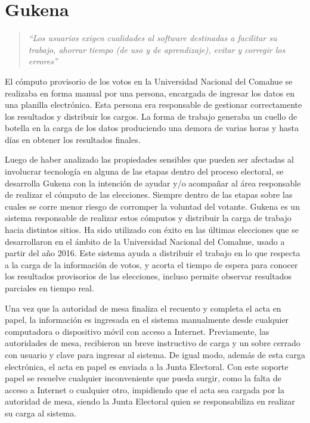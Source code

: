 \label{Gukena}
\chapter{Gukena}
\begin{quote}\textit{``Los usuarios exigen cualidades al software destinadas a facilitar su trabajo, ahorrar tiempo (de uso y de aprendizaje), evitar y corregir los errores''} \cite{definicionUsuarioInterfaz}\end{quote} 
El cómputo provisorio de los votos en la Universidad Nacional del Comahue se realizaba en forma manual por una persona, encargada de ingresar los datos en una planilla electrónica. Esta persona era responsable de gestionar correctamente los resultados y distribuir los cargos. La forma de trabajo generaba un cuello de botella en la carga de los datos produciendo una demora de varias horas y hasta días en obtener los resultados finales.

Luego de haber analizado las propiedades sensibles que pueden ser afectadas al involucrar tecnología en alguna de las etapas dentro del proceso electoral, se desarrolla Gukena con la intención de ayudar y/o 
acompañar al área responsable de realizar el cómputo de las elecciones. Siempre dentro de las etapas sobre las cuales se corre menor riesgo de corromper la voluntad del votante. Gukena es un sistema responsable de realizar estos cómputos y distribuir la carga de trabajo hacia distintos sitios. Ha sido utilizado con éxito en las últimas elecciones que se desarrollaron en el ámbito de la Universidad Nacional del Comahue, usado a partir del año 2016. Este sistema ayuda a distribuir el trabajo en lo que respecta a la carga de la información de votos, y acorta el tiempo de espera para conocer los resultados provisorios de las elecciones, incluso permite observar resultados parciales en tiempo real.\newline

Una vez que la autoridad de mesa finaliza el recuento y completa el acta en papel,  la información es ingresada en el sistema manualmente desde cualquier computadora o dispositivo móvil con acceso a Internet. Previamente, las autoridades de mesa, recibieron un breve instructivo de carga y un sobre cerrado con usuario y clave para ingresar al sistema. De igual modo, además de esta carga electrónica, el acta en papel es enviada a la Junta Electoral. Con este soporte papel se resuelve cualquier inconveniente que pueda surgir, como la falta de acceso a Internet o cualquier otro,  impidiendo que el acta sea cargada por la autoridad de mesa, siendo la Junta Electoral quien se responsabiliza en realizar su carga al sistema.

